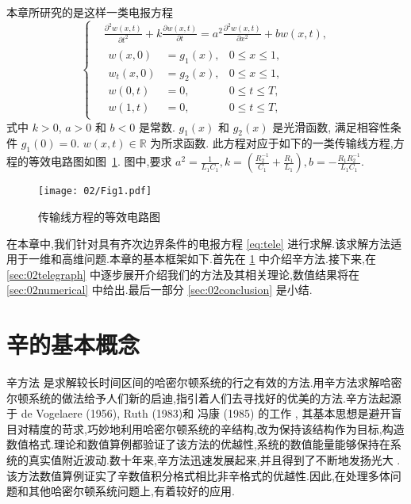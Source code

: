 本章所研究的是这样一类电报方程
\begin{equation}\label{eq:tele}
\left\lbrace
\begin{aligned}
&\frac{\partial ^2 w(x,t)}{\partial t^2}+k\frac{\partial w(x,t)}{\partial t}=a^2 \frac{\partial ^2 w(x,t)}{\partial x^2} + b w(x,t),\\
&\begin{aligned}
w(x,0)&=g_1(x),&0 \le x \le 1,\\
w_t(x,0)&=g_2(x),&0 \le x \le 1,\\
w(0,t)&=0,&0 \le t \le T,\\
w(1,t)&=0,&0 \le t \le T,
\end{aligned}
\end{aligned}
\right.
\end{equation}
式中 $k > 0$, $a>0$ 和 $b < 0$ 是常数. $g_1(x)$ 和 $g_2(x)$ 是光滑函数, 满足相容性条件 $g_1(0)=0$. $w(x,t) \in \mathbb{R}$ 为所求函数. 此方程对应于如下的一类传输线方程,方程的等效电路图如图~\ref{fig:tele1}. 图中,要求 $a^2 = \frac{1}{L_1C_1}, k= (\frac{R_2^{-1}}{C_1}+\frac{R_1}{L_1}), b =-\frac{R_1R_2^{-1}}{L_1C_1}$.
\begin{figure}[h]
    \centering
    \texttt{[image: 02/Fig1.pdf]}
    \caption{传输线方程的等效电路图}
    \label{fig:tele1}
\end{figure}

在本章中,我们针对具有齐次边界条件的电报方程 \eqref{eq:tele} 进行求解.该求解方法适用于一维和高维问题.本章的基本框架如下.首先在 \ref{sec:02symplectic} 中介绍辛方法.接下来,在 \ref{sec:02telegraph} 中逐步展开介绍我们的方法及其相关理论,数值结果将在 \ref{sec:02numerical} 中给出.最后一部分 \ref{sec:02conclusion} 是小结.

\section{辛的基本概念}\label{sec:02symplectic}
辛方法 \cite{feng2010symplectic} 是求解较长时间区间的哈密尔顿系统的行之有效的方法.用辛方法求解哈密尔顿系统的做法给予人们新的启迪,指引着人们去寻找好的优美的方法.辛方法起源于 de Vogelaere (1956), Ruth (1983)和 冯康 (1985) 的工作 \cite{hairer2006geometric}, 其基本思想是避开盲目对精度的苛求,巧妙地利用哈密尔顿系统的辛结构,改为保持该结构作为目标,构造数值格式.理论和数值算例都验证了该方法的优越性,系统的数值能量能够保持在系统的真实值附近波动.数十年来,辛方法迅速发展起来,并且得到了不断地发扬光大 \cite{calvo1994numerical,leimkuhler2004simulating,hong2006multi,yang2009extended,monovasilis2013exponentially,xin2016birkhoffian,michalas2016numerical,liao2016multi}. 该方法数值算例证实了辛数值积分格式相比非辛格式的优越性.因此,在处理多体问题和其他哈密尔顿系统问题上,有着较好的应用.

